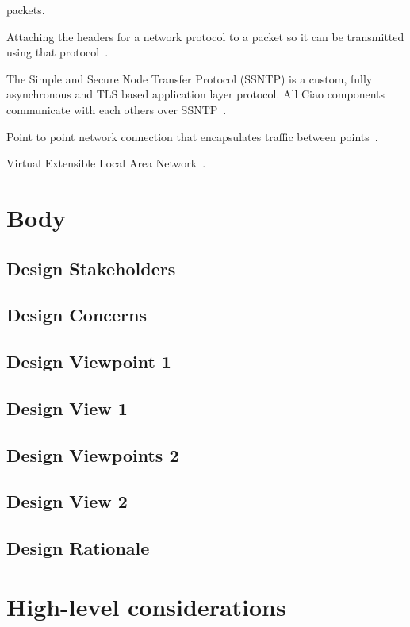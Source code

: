 \documentclass[10pt,letterpaper,onecolumn,journal]{IEEEtran}
\begin{document}
\begin{description}[leftmargin=12em,style=nextline]
		packets.
	\item[Packet Encapsulation]
		Attaching the headers for a network protocol to a packet so it
		can be transmitted using that
		protocol~\cite{networkingTextbook}.
	\item[SSNTP]
		The Simple and Secure Node Transfer Protocol (SSNTP) is a
		custom, fully asynchronous and TLS based application layer
		protocol. All Ciao components communicate with each others over
		SSNTP~\cite{ciaoSSNTP}.
	\item[Tunnel]
		Point to point network connection that encapsulates traffic
		between points~\cite{networkingTextbook}.
	\item[VxLAN]
		Virtual Extensible Local Area Network~\cite{rfc7348}.
\end{description}

\section{Body}
\subsection{Design Stakeholders}
\subsection{Design Concerns}

\subsection{Design Viewpoint 1}
\subsection{Design View 1}
\subsection{Design Viewpoints 2}
\subsection{Design View 2}

\subsection{Design Rationale}

\section{High-level considerations}
\end{document}
